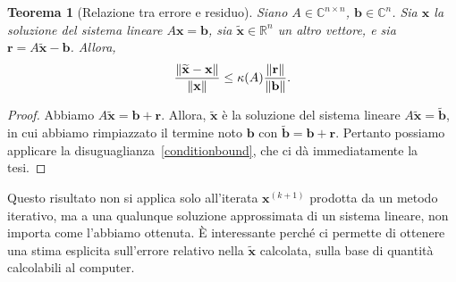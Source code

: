 \documentclass[a4paper]{report}
\DeclarePairedDelimiter{\norm}{\lVert}{\rVert}
\newtheorem{theorem}{Teorema}[chapter]
\theoremstyle{definition}
\theoremstyle{remark}
\newcommand{\x}{\mathbf{x}}
\renewcommand{\b}{\mathbf{b}}
\begin{document}
\begin{theorem}[Relazione tra errore e residuo]
Siano $A \in \mathbb{C}^{n\times n}$, $\b\in\mathbb{C}^n$. Sia $\x$ la soluzione del sistema lineare $A\x=\b$, sia $\widetilde{\x}\in\mathbb{R}^n$ un altro vettore, e sia $\mathbf{r} = A\widetilde{\x}-\b$. Allora,
\[
\frac{\norm{\widetilde{\x}-\x}}{\norm{\x}} \leq \kappa(A) \frac{\norm{\mathbf{r}}}{\norm{\b}}.
\]
\end{theorem}
\begin{proof}
Abbiamo $A\widetilde{\x} = \b + \mathbf{r}$. Allora, $\widetilde{\x}$ è la soluzione del sistema lineare $A\widetilde{\x} = \widetilde{\b}$, in cui abbiamo rimpiazzato il termine noto $\b$ con $\widetilde{\b} = \b + \mathbf{r}$. Pertanto possiamo applicare la disuguaglianza~\eqref{conditionbound}, che ci dà immediatamente la tesi.
\end{proof}
Questo risultato non si applica solo all'iterata $\x^{(k+1)}$ prodotta da un metodo iterativo, ma a una qualunque soluzione approssimata di un sistema lineare, non importa come l'abbiamo ottenuta. È interessante perché ci permette di ottenere una stima esplicita sull'errore relativo nella $\widetilde{\x}$ calcolata, sulla base di quantità calcolabili al computer.
\end{document}
